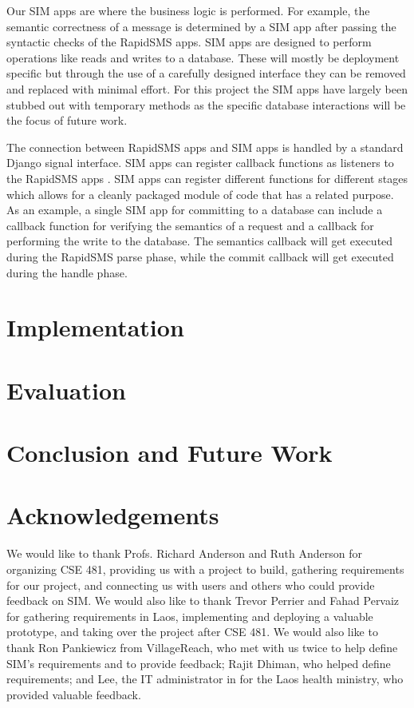 \documentclass{acm_proc_article-sp}
\begin{document}
Our SIM apps are where the business logic is performed. For example, the semantic correctness of a message is determined by a SIM app after passing the syntactic checks of the RapidSMS apps. SIM apps are designed to perform operations like reads and writes to a database. These will mostly be deployment specific but through the use of a carefully designed interface they can be removed and replaced with minimal effort. For this project the SIM apps have largely been stubbed out with temporary methods as the specific database interactions will be the focus of future work.

The connection between RapidSMS apps and SIM apps is handled by a standard Django signal interface. SIM apps can register callback functions as listeners to the RapidSMS apps \cite{django:signals}. SIM apps can register different functions for different stages which allows for a cleanly packaged module of code that has a related purpose. As an example, a single SIM app for committing to a database can include a callback function for verifying the semantics of a request and a callback for performing the write to the database. The semantics callback will get executed during the RapidSMS parse phase, while the commit callback will get executed during the handle phase.

\section{Implementation}

\section{Evaluation}

\section{Conclusion and Future Work}

\section{Acknowledgements}

We would like to thank Profs. Richard Anderson and Ruth Anderson for organizing CSE 481, providing us with a project to build, gathering requirements for our project, and connecting us with users and others who could provide feedback on SIM. We would also like to thank Trevor Perrier and Fahad Pervaiz for gathering requirements in Laos, implementing and deploying a valuable prototype, and taking over the project after CSE 481. We would also like to thank Ron Pankiewicz from VillageReach, who met with us twice to help define SIM's requirements and to provide feedback; Rajit Dhiman, who helped define requirements; and Lee, the IT administrator in for the Laos health ministry, who provided valuable feedback.
\end{document}
